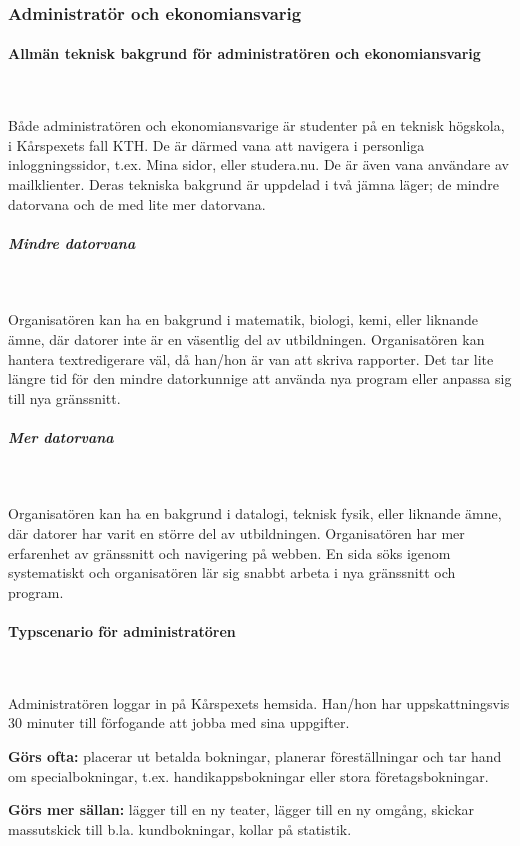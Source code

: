 \documentclass[a4paper, twoside, 11pt, titlepage]{article}
\begin{document}
		\subsubsection{Administratör och ekonomiansvarig}



			\paragraph{Allmän teknisk bakgrund för administratören och ekonomiansvarig}\

			Både administratören och ekonomiansvarige är studenter på en teknisk högskola, i Kårspexets fall KTH. De är därmed vana att navigera i personliga inloggningssidor, t.ex. Mina sidor, eller studera.nu. De är även vana användare av mailklienter. Deras tekniska bakgrund är uppdelad i två jämna läger; de mindre datorvana och de med lite mer datorvana.

			\subparagraph{\emph{Mindre datorvana}}\

				Organisatören kan ha en bakgrund i matematik, biologi, kemi, eller liknande ämne, där datorer inte är en väsentlig del av utbildningen. Organisatören kan hantera textredigerare väl, då han/hon är van att skriva rapporter. Det tar lite längre tid för den mindre datorkunnige att använda nya program eller anpassa sig till nya gränssnitt.

			\subparagraph{\emph{Mer datorvana}}\

				Organisatören kan ha en bakgrund i datalogi, teknisk fysik, eller liknande ämne, där datorer har varit en större del av utbildningen. Organisatören har mer erfarenhet av gränssnitt och navigering på webben. En sida söks igenom systematiskt och organisatören lär sig snabbt arbeta i nya gränssnitt och program.

			\paragraph{Typscenario för administratören}\

			Administratören loggar in på Kårspexets hemsida. Han/hon har uppskattningsvis 30 minuter till förfogande att jobba med sina uppgifter.

			\textbf{Görs ofta:} placerar ut betalda bokningar, planerar föreställningar och tar hand om specialbokningar, t.ex. handikappsbokningar eller stora företagsbokningar. 

			\textbf{Görs mer sällan:} lägger till en ny teater, lägger till en ny omgång, skickar massutskick till b.la. kundbokningar, kollar på statistik.
\end{document}
